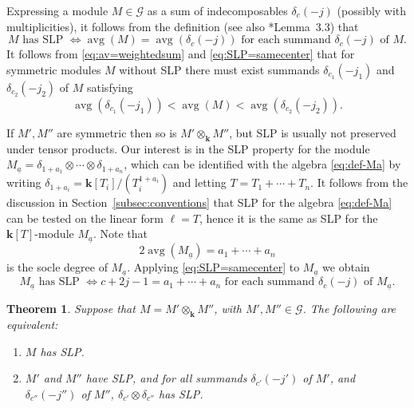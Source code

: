 \documentclass[11pt,reqno]{amsart}
\def\kk{{\mathbf k}}
\newcommand{\oo}{\otimes}
\newcommand{\avg}{\operatorname{avg}}
\newcommand{\mc}[1]{\mathcal{#1}}
\newcommand{\ul}[1]{\underline{#1}}
\newtheorem{theorem}{Theorem}[section]
\theoremstyle{definition}
\theoremstyle{remark}
\numberwithin{equation}{section}
\begin{document}
Expressing a module $M\in\mc{G}$ as a sum of indecomposables $\delta_c(-j)$ (possibly with multiplicities), it follows from the definition (see also \cite{harima-watanabe}*{Lemma~3.3}) that 
\begin{equation}\label{eq:SLP=samecenter}
M\text{ has SLP }\Longleftrightarrow\avg(M) = \avg(\delta_c(-j))\text{ for each summand }\delta_c(-j)\text{ of }M.
\end{equation}
It follows from \eqref{eq:av=weightedsum} and \eqref{eq:SLP=samecenter} that for symmetric modules $M$ without SLP there must exist summands $\delta_{c_1}(-j_1)$ and $\delta_{c_2}(-j_2)$ of $M$ satisfying
\[\avg(\delta_{c_1}(-j_1)) < \avg(M) < \avg(\delta_{c_2}(-j_2)).\]

If $M',M''$ are symmetric then so is $M'\oo_{\kk} M''$, but SLP is usually not preserved under tensor products. Our interest is in the SLP property for the module $M_{\ul{a}} = \delta_{1+a_1}\oo \cdots \oo \delta_{1+a_n}$, which can be identified with the algebra \eqref{eq:def-Ma} by writing $\delta_{1+a_i}=\kk[T_i]/(T_i^{1+a_i})$ and letting $T=T_1+\cdots+T_n$. It follows from the discussion in Section~\ref{subsec:conventions} that SLP for the algebra \eqref{eq:def-Ma} can be tested on the linear form $\ell=T$, hence it is the same as SLP for the $\kk[T]$-module $M_{\ul{a}}$. Note that
\[2\avg(M_{\ul{a}}) = a_1+\cdots+a_n\]
is the socle degree of $M_{\ul{a}}$. Applying \eqref{eq:SLP=samecenter} to $M_{\ul{a}}$ we obtain
\begin{equation}\label{eq:SLP-forMa}
M_{\ul{a}}\text{ has SLP }\Longleftrightarrow c+2j-1=a_1+\cdots+a_n\text{ for each summand }\delta_c(-j)\text{ of }M_{\ul{a}}.
\end{equation}

\begin{theorem}\label{thm:tensor-SLP}
    Suppose that $M=M'\oo_{\kk} M''$, with $M',M''\in\mc{G}$. The following are equivalent:
    \begin{enumerate}
        \item $M$ has SLP.
        \item $M'$ and $M''$ have SLP, and for all summands $\delta_{c'}(-j')$ of $M'$, and $\delta_{c''}(-j'')$ of $M''$, $\delta_{c'}\oo\delta_{c''}$ has SLP.
    \end{enumerate}
\end{theorem}
\end{document}
